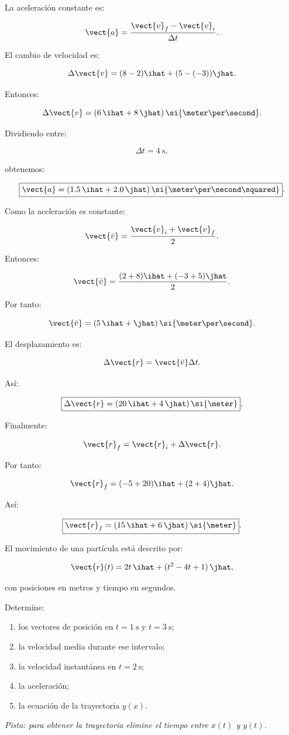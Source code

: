 \begin{explicacion}
La aceleración constante es:

\[
\vect{a}
=
\frac{\vect{v}_f-\vect{v}_i}{\Delta t}.
\]

El cambio de velocidad es:

\[
\Delta\vect{v}
=
(8-2)\ihat
+
(5-(-3))\jhat.
\]

Entonces:

\[
\Delta\vect{v}
=
(6\,\ihat+8\,\jhat)\,
\si{\meter\per\second}.
\]

Dividiendo entre:

\[
\Delta t=\SI{4}{\second},
\]

obtenemos:

\[
\boxed{
\vect{a}
=
(1.5\,\ihat+2.0\,\jhat)\,
\si{\meter\per\second\squared}
}.
\]

Como la aceleración es constante:

\[
\vect{\bar{v}}
=
\frac{\vect{v}_i+\vect{v}_f}{2}.
\]

Entonces:

\[
\vect{\bar{v}}
=
\frac{
(2+8)\ihat+(-3+5)\jhat
}{2}.
\]

Por tanto:

\[
\vect{\bar{v}}
=
(5\,\ihat+\jhat)\,
\si{\meter\per\second}.
\]

El desplazamiento es:

\[
\Delta\vect{r}
=
\vect{\bar{v}}\Delta t.
\]

Así:

\[
\boxed{
\Delta\vect{r}
=
(20\,\ihat+4\,\jhat)\,\si{\meter}
}.
\]

Finalmente:

\[
\vect{r}_f
=
\vect{r}_i+\Delta\vect{r}.
\]

Por tanto:

\[
\vect{r}_f
=
(-5+20)\ihat
+
(2+4)\jhat.
\]

Así:

\[
\boxed{
\vect{r}_f
=
(15\,\ihat+6\,\jhat)\,\si{\meter}
}.
\]
\end{explicacion}


\begin{ejercicio}
El movimiento de una partícula está descrito por:

\[
\vect{r}(t)
=
2t\,\ihat
+
(t^2-4t+1)\,\jhat,
\]

con posiciones en metros y tiempo en segundos.

Determine:

\begin{enumerate}[label=\alph*)]
    \item los vectores de posición en \(t=\SI{1}{\second}\) y \(t=\SI{3}{\second}\);
    \item la velocidad media durante ese intervalo;
    \item la velocidad instantánea en \(t=\SI{2}{\second}\);
    \item la aceleración;
    \item la ecuación de la trayectoria \(y(x)\).
\end{enumerate}

\textit{Pista: para obtener la trayectoria elimine el tiempo entre \(x(t)\) y \(y(t)\).}
\end{ejercicio}

